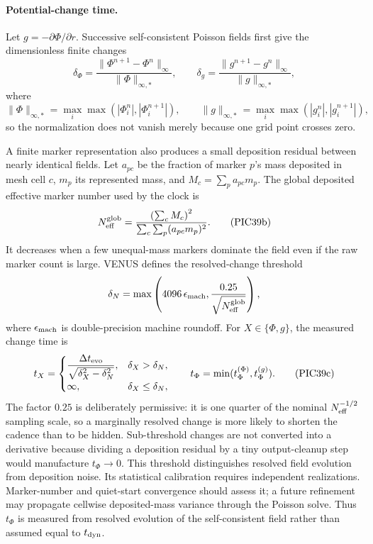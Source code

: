 \paragraph{Potential-change time.}
Let \(g=-\partial\Phi/\partial r\).  Successive self-consistent Poisson fields
first give the dimensionless finite changes
\[
 \delta_\Phi=
 \frac{\|\Phi^{n+1}-\Phi^n\|_\infty}
      {\|\Phi\|_{\infty,*}},
 \qquad
 \delta_g=
 \frac{\|g^{n+1}-g^n\|_\infty}
      {\|g\|_{\infty,*}},                              \tag{PIC39a}
\]
where
\[
 \|\Phi\|_{\infty,*}=\max_i\max(|\Phi_i^n|,|\Phi_i^{n+1}|),
 \qquad
 \|g\|_{\infty,*}=\max_i\max(|g_i^n|,|g_i^{n+1}|),
\]
so the normalization does not vanish merely because one grid point crosses
zero.

A finite marker representation also produces a small deposition residual
between nearly identical fields.  Let \(a_{pc}\) be the fraction of marker
\(p\)'s mass deposited in mesh cell \(c\), \(m_p\) its represented mass, and
\(M_c=\sum_p a_{pc}m_p\).  The global deposited effective marker number used
by the clock is
\[
 N_{\rm eff}^{\rm glob}
 =\frac{\left(\sum_c M_c\right)^2}
        {\sum_c\sum_p(a_{pc}m_p)^2}.                   \tag{PIC39b}
\]
It decreases when a few unequal-mass markers dominate the field even if the
raw marker count is large.  VENUS defines the resolved-change threshold
\[
 \delta_N=\max\left(4096\,\epsilon_{\rm mach},
                    \frac{0.25}{\sqrt{N_{\rm eff}^{\rm glob}}}\right),
\]
where \(\epsilon_{\rm mach}\) is double-precision machine roundoff.  For
\(X\in\{\Phi,g\}\), the measured change time is
\[
 t_X=
 \begin{cases}
 \displaystyle
 \frac{\Delta t_{\rm evo}}
      {\sqrt{\delta_X^2-\delta_N^2}},&
             \delta_X>\delta_N,\\[6pt]
 \infty,& \delta_X\leq\delta_N ,
 \end{cases}
 \qquad t_\Phi=\min(t_\Phi^{(\Phi)},t_\Phi^{(g)}).      \tag{PIC39c}
\]
The factor \(0.25\) is deliberately permissive: it is one quarter of the
nominal \(N_{\rm eff}^{-1/2}\) sampling scale, so a marginally resolved change
is more likely to shorten the cadence than to be hidden.  Sub-threshold
changes are not converted into a derivative because dividing a deposition
residual by a tiny output-cleanup step would manufacture
\(t_\Phi\rightarrow0\).  This threshold distinguishes resolved field evolution from deposition noise.
Its statistical calibration requires independent realizations.  Marker-number and quiet-start convergence should assess
it; a future refinement may propagate cellwise deposited-mass variance
through the Poisson solve.  Thus \(t_\Phi\) is measured from resolved evolution
of the self-consistent field rather than assumed equal to \(t_{\rm dyn}\).

